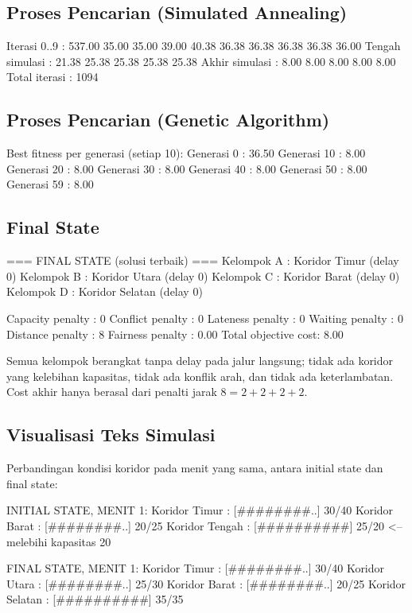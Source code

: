 \documentclass[11pt,a4paper]{article}
\begin{document}
\subsection{Proses Pencarian (Simulated Annealing)}

\begin{outcode}
Iterasi 0..9      : 537.00 35.00 35.00 39.00 40.38 36.38 36.38 36.38 36.38 36.00
Tengah simulasi   : 21.38 25.38 25.38 25.38 25.38
Akhir simulasi    : 8.00 8.00 8.00 8.00 8.00
Total iterasi     : 1094
\end{outcode}

\subsection{Proses Pencarian (Genetic Algorithm)}

\begin{outcode}
Best fitness per generasi (setiap 10):
Generasi 0    : 36.50
Generasi 10   : 8.00
Generasi 20   : 8.00
Generasi 30   : 8.00
Generasi 40   : 8.00
Generasi 50   : 8.00
Generasi 59   : 8.00
\end{outcode}

\subsection{Final State}

\begin{outcode}
=== FINAL STATE (solusi terbaik) ===
Kelompok A  : Koridor Timur (delay 0)
Kelompok B  : Koridor Utara (delay 0)
Kelompok C  : Koridor Barat (delay 0)
Kelompok D  : Koridor Selatan (delay 0)

Capacity penalty : 0
Conflict penalty : 0
Lateness penalty : 0
Waiting penalty  : 0
Distance penalty : 8
Fairness penalty : 0.00
Total objective cost: 8.00
\end{outcode}

Semua kelompok berangkat tanpa delay pada jalur langsung; tidak ada koridor yang kelebihan kapasitas, tidak ada konflik arah, dan tidak ada keterlambatan. Cost akhir hanya berasal dari penalti jarak $8 = 2+2+2+2$.

\subsection{Visualisasi Teks Simulasi}

Perbandingan kondisi koridor pada menit yang sama, antara initial state dan final state:

\begin{outcode}
INITIAL STATE, MENIT 1:
Koridor Timur  : [########..] 30/40
Koridor Barat  : [########..] 20/25
Koridor Tengah : [##########] 25/20   <-- melebihi kapasitas 20

FINAL STATE, MENIT 1:
Koridor Timur  : [########..] 30/40
Koridor Utara  : [########..] 25/30
Koridor Barat  : [########..] 20/25
Koridor Selatan : [##########] 35/35
\end{outcode}
\end{document}
